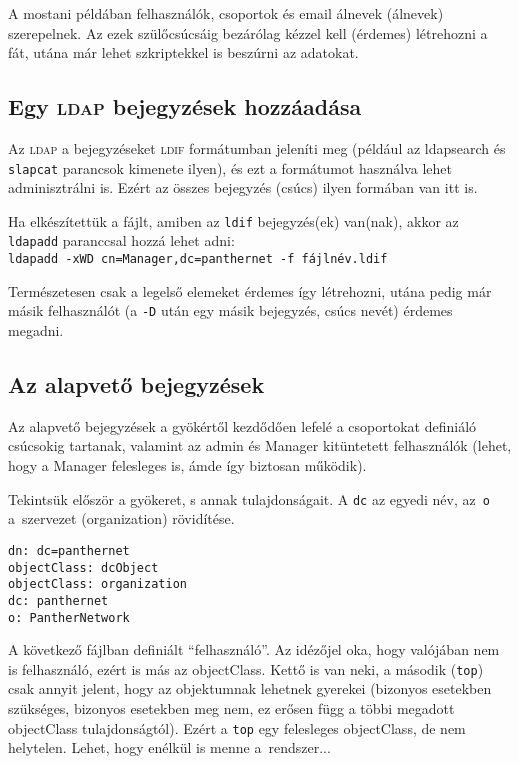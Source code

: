 A mostani példában felhasználók, csoportok és email álnevek (álnevek) szerepelnek. Az ezek szülőcsúcsáig bezárólag
kézzel kell (érdemes) létrehozni a fát, utána már lehet szkriptekkel is beszúrni az adatokat.



\subsection{Egy \textsc{ldap} bejegyzések hozzáadása}

Az \textsc{ldap} a bejegyzéseket \textsc{ldif} formátumban jeleníti meg (például az ldapsearch és \texttt{slapcat} parancsok kimenete ilyen), és
ezt a formátumot használva lehet adminisztrálni is. Ezért az összes bejegyzés (csúcs) ilyen formában van itt is.

Ha elkészítettük a fájlt, amiben az \texttt{ldif} bejegyzés(ek) van(nak), akkor az \texttt{ldapadd} paranccsal hozzá lehet adni:\\
\texttt{ldapadd -xWD cn=Manager,dc=panthernet -f fájlnév.ldif}

Természetesen csak a legelső elemeket érdemes így létrehozni, utána pedig már másik felhasználót (a \texttt{-D} után egy
másik bejegyzés, csúcs nevét) érdemes megadni.


\subsection{Az alapvető bejegyzések}

Az alapvető bejegyzések a gyökértől kezdődően lefelé a csoportokat definiáló csúcsokig tartanak, valamint az admin és
Manager kitüntetett felhasználók (lehet, hogy a Manager felesleges is, ámde így biztosan működik).

Tekintsük először a gyökeret, s annak tulajdonságait.
A \texttt{dc} az egyedi név, az~\texttt{o} a~szervezet (organization) rövidítése.

\begin{Verbatim}[frame=single]
dn: dc=panthernet
objectClass: dcObject
objectClass: organization
dc: panthernet
o: PantherNetwork  
\end{Verbatim}


\noindent A következő  fájlban definiált ``felhasználó''. Az idézőjel oka, hogy valójában nem is
felhasználó, ezért is más az objectClass. Kettő is van neki, a második (\texttt{top}) csak annyit jelent, hogy az
objektumnak lehetnek gyerekei (bizonyos esetekben szükséges, bizonyos esetekben meg nem, ez erősen függ a többi megadott
objectClass tulajdonságtól). Ezért a \texttt{top} egy felesleges objectClass, de nem helytelen. Lehet, hogy enélkül is
menne a~rendszer...


